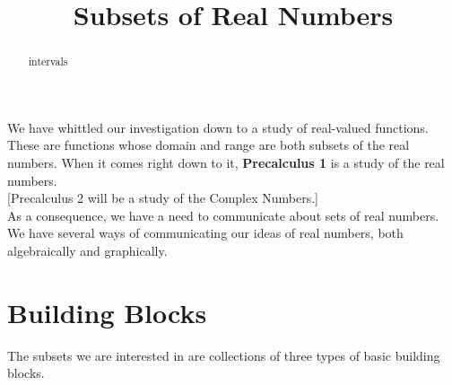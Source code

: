 \documentclass{ximera}
\title{Subsets of Real Numbers}
\begin{document}
\begin{abstract}
intervals
\end{abstract}
\maketitle




We have whittled our investigation down to a study of real-valued functions.  These are functions whose domain and range are both subsets of the real numbers.  When it comes right down to it, \textbf{Precalculus 1} is a study of the real numbers. \\




[Precalculus 2 will be a study of the Complex Numbers.] \\



As a consequence, we have a need to communicate about sets of real numbers.  We have several ways of communicating our ideas of real numbers, both algebraically and graphically.


\section*{Building Blocks}

The subsets we are interested in are collections of three types of basic building blocks.
\end{document}
